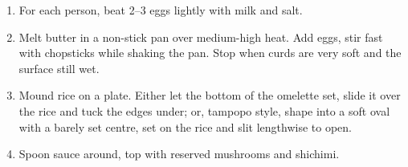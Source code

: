 
\begin{ingredients}
\end{ingredients}

\begin{recipe}
  \begin{enumerate}

  \item For each person, beat 2--3 eggs lightly with milk and salt.

  \item Melt butter in a non-stick pan over medium-high heat.  Add
    eggs, stir fast with chopsticks while shaking the pan.  Stop when
    curds are very soft and the surface still wet.

  \item Mound rice on a plate.  Either let the bottom of the omelette
    set, slide it over the rice and tuck the edges under; or, tampopo
    style, shape into a soft oval with a barely set centre, set on the
    rice and slit lengthwise to open.

  \item Spoon sauce around, top with reserved mushrooms and shichimi.

  \end{enumerate}
\end{recipe}

